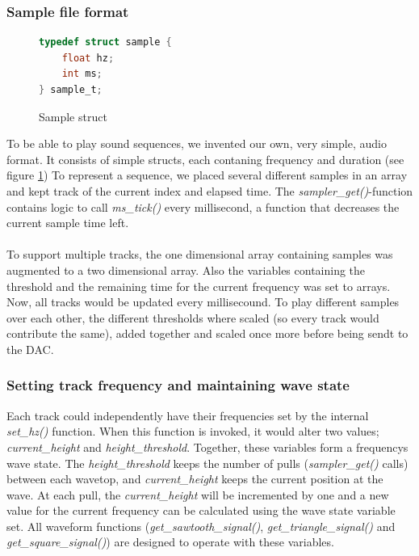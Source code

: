 \subsubsection{Sample file format}
\begin{figure}[h]
	\centering
	\begin{lstlisting}[language=C]
typedef struct sample {
	float hz;
	int ms;
} sample_t;
	\end{lstlisting}
	\caption{Sample struct}
	\label{file_format_struct}
\end{figure}
To be able to play sound sequences, we invented our own, very simple, audio format. It consists of simple structs, each contaning frequency and duration (see figure \ref{file_format_struct}) To represent a sequence, we placed several different samples in an array and kept track of the current index and elapsed time. The \emph{sampler\_get()}-function contains logic to call \emph{ms\_tick()} every millisecond, a function that decreases the current sample time left.\\
\\
To support multiple tracks, the one dimensional array containing samples was augmented to a two dimensional array. Also the variables containing the threshold and the remaining time for the current frequency was set to arrays. Now, all tracks would be updated every millisecound. To play different samples over each other, the different thresholds where scaled (so every track would contribute the same), added together and scaled once more before being sendt to the DAC.

\subsubsection{Setting track frequency and maintaining wave state}
Each track could independently have their frequencies set by the internal \emph{set\_hz()} function. When this function is invoked, it would alter two values; \emph{current\_height} and \emph{height\_threshold}. Together, these variables form a frequencys wave state. The \emph{height\_threshold} keeps the number of pulls (\emph{sampler\_get()} calls) between each wavetop, and \emph{current\_height} keeps the current position at the wave. At each pull, the \emph{current\_height} will be incremented by one and a new value for the current frequency can be calculated using the wave state variable set. All waveform functions (\emph{get\_sawtooth\_signal()}, \emph{get\_triangle\_signal()} and \emph{get\_square\_signal()}) are designed to operate with these variables.


